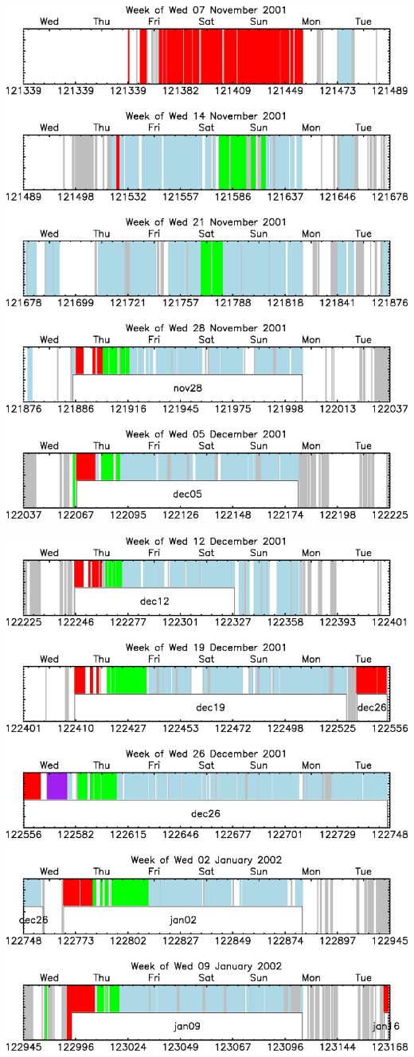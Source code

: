 \documentclass[12pt]{article}
\begin{document}
\mbox{ } \vfill \includegraphics[width=\linewidth]{fits2_dates01.eps} \vfill \mbox{ } \pagebreak
\mbox{ } \vfill \includegraphics[width=\linewidth]{fits2_dates02.eps} \vfill \mbox{ } \pagebreak
\end{document}

